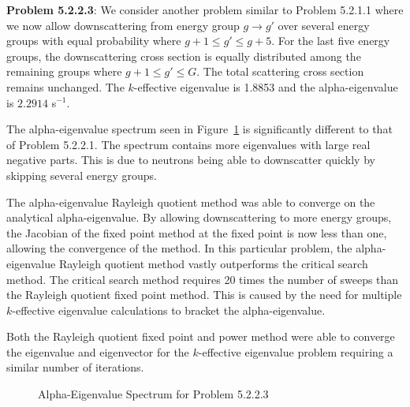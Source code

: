 \textbf{Problem 5.2.2.3}: We consider another problem similar to Problem 5.2.1.1 where we now allow downscattering from energy group $g \rightarrow g'$ over several energy groups with equal probability where $g + 1 \leq g' \leq g+5$. For the last five energy groups, the downscattering cross section is equally distributed among the remaining groups where $g+1 \leq g' \leq G$. The total scattering cross section remains unchanged. The $k$-effective eigenvalue is 1.8853 and the alpha-eigenvalue is $2.2914$ s$^{-1}$.

The alpha-eigenvalue spectrum seen in Figure~\ref{fig:G81P3Spec} is significantly different to that of Problem 5.2.2.1. The spectrum contains more eigenvalues with large real negative parts. This is due to neutrons being able to downscatter quickly by skipping several energy groups.

The alpha-eigenvalue Rayleigh quotient method was able to converge on the analytical alpha-eigenvalue. By allowing downscattering to more energy groups, the Jacobian of the fixed point method at the fixed point is now less than one, allowing the convergence of the method. In this particular problem, the alpha-eigenvalue Rayleigh quotient method vastly outperforms the critical search method. The critical search method requires 20 times the number of sweeps than the Rayleigh quotient fixed point method. This is caused by the need for multiple $k$-effective eigenvalue calculations to bracket the alpha-eigenvalue.

Both the Rayleigh quotient fixed point and power method were able to converge the eigenvalue and eigenvector for the $k$-effective eigenvalue problem requiring a similar number of iterations. 

\begin{figure}
\centering
	\resizebox{0.75\textwidth}{!}{
	}
\caption{Alpha-Eigenvalue Spectrum for Problem 5.2.2.3}
\label{fig:G81P3Spec}
\end{figure}

\begin{table}[!htbp]
    \centering
    \caption{Transport Sweeps for Convergence for Problem 5.2.2.3}
\label{table:G81c}
\end{table}

